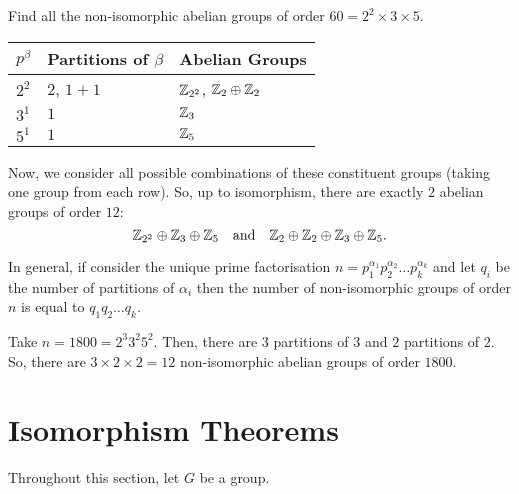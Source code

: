 \documentclass[11pt]{penrose}
\begin{document}
\begin{negg}
    Find all the non-isomorphic abelian groups of order $60 = 2^{2} \times 3 \times 5$.
    \begin{center}
        \begin{tabularx}{0.66\textwidth}{p{8mm}XX}
            \toprule
            $p^{\beta}$ & Partitions of $\beta$ & Abelian Groups\\
            \midrule
            $2^{2}$ & $2$, $1+1$ & $\mathbb{Z}_{2^{2}}$, $\mathbb{Z}_{2} \oplus \mathbb{Z}_{2}$ \\
            $3^{1}$ & $1$        & $\mathbb{Z}_{3}$ \\
            $5^{1}$ & $1$        & $\mathbb{Z}_{5}$ \\
            \bottomrule
        \end{tabularx}
    \end{center}
    Now, we consider all possible combinations of these constituent groups (taking one group from each row). So, up to isomorphism, there are exactly $2$ abelian groups of order $12$:
    \begin{equation*}
        \mathbb{Z}_{2^{2}} \oplus \mathbb{Z}_{3} \oplus \mathbb{Z}_{5}
        \quad\text{and}\quad 
        \mathbb{Z}_{2} \oplus \mathbb{Z}_{2} \oplus \mathbb{Z}_{3} \oplus \mathbb{Z}_{5}.
    \end{equation*}
\end{negg}

In general, if consider the unique prime factorisation $n = p_{1}^{\alpha_{1}} p_{2}^{\alpha_{2}} \dots p_{k}^{\alpha_{k}}$ and let $q_{i}$ be the number of partitions of $\alpha_{i}$ then the number of non-isomorphic groups of order $n$ is equal to $q_{1} q_{2} \dots q_{k}$.

\begin{negg}
    Take $n = 1800 = 2^{3} 3^{2} 5^{2}$. Then, there are $3$ partitions of $3$ and $2$ partitions of $2$. So, there are $3 \times 2 \times 2 = 12$ non-isomorphic abelian groups of order $1800$.
\end{negg}


\section{Isomorphism Theorems}

Throughout this section, let $G$ be a group.
\end{document}
